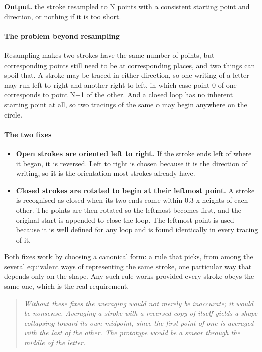 \noindent\textbf{Output.} the stroke resampled to N points with a consistent starting point and direction, or nothing if it is too short.


\paragraph{The problem beyond resampling}
Resampling makes two strokes have the same number of points, but corresponding points still need to be at corresponding places, and two things can spoil that. A stroke may be traced in either direction, so one writing of a letter may run left to right and another right to left, in which case point 0 of one corresponds to point N$-$1 of the other. And a closed loop has no inherent starting point at all, so two tracings of the same o may begin anywhere on the circle.


\paragraph{The two fixes}

\begin{itemize}\setlength\itemsep{0pt}
  \item \textbf{Open strokes are oriented left to right.} If the stroke ends left of where it began, it is reversed. Left to right is chosen because it is the direction of writing, so it is the orientation most strokes already have.
  \item \textbf{Closed strokes are rotated to begin at their leftmost point.} A stroke is recognised as closed when its two ends come within 0.3 x-heights of each other. The points are then rotated so the leftmost becomes first, and the original start is appended to close the loop. The leftmost point is used because it is well defined for any loop and is found identically in every tracing of it.
\end{itemize}
Both fixes work by choosing a canonical form: a rule that picks, from among the several equivalent ways of representing the same stroke, one particular way that depends only on the shape. Any such rule works provided every stroke obeys the same one, which is the real requirement.


\begin{quote}\small\itshape Without these fixes the averaging would not merely be inaccurate; it would be nonsense. Averaging a stroke with a reversed copy of itself yields a shape collapsing toward its own midpoint, since the first point of one is averaged with the last of the other. The prototype would be a smear through the middle of the letter.\end{quote}

